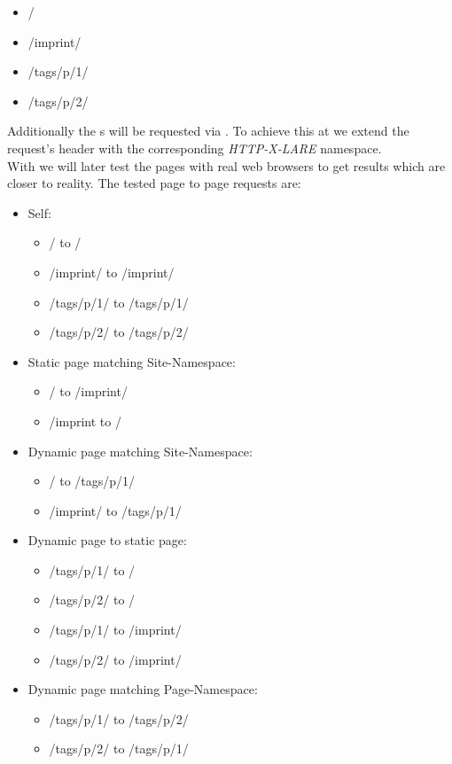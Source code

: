 \begin{itemize}
\item /
\item /imprint/
\item /tags/p/1/
\item /tags/p/2/
\end{itemize}

\noindent{}Additionally the \webPage{}s will be requested via \lare{}.
To achieve this at \curl{} we extend the request's header with the corresponding \emph{HTTP-X-LARE} namespace.
\\
With \selenium{} we will later test the pages with real web browsers to get results which are closer to reality.
The tested page to page requests are:

\begin{itemize}
  \item Self:
    \begin{itemize}
      \item / to /
      \item /imprint/ to /imprint/
      \item /tags/p/1/ to /tags/p/1/
      \item /tags/p/2/ to /tags/p/2/
    \end{itemize}
  \item Static page matching Site-Namespace:
    \begin{itemize}
      \item / to /imprint/
      \item /imprint to /
    \end{itemize}
  \item Dynamic page matching Site-Namespace:
    \begin{itemize}
      \item / to /tags/p/1/
      \item /imprint/ to /tags/p/1/
    \end{itemize}
  \item Dynamic page to static page:
    \begin{itemize}
      \item /tags/p/1/ to /
      \item /tags/p/2/ to /
      \item /tags/p/1/ to /imprint/
      \item /tags/p/2/ to /imprint/
    \end{itemize}
  \item Dynamic page matching Page-Namespace:
    \begin{itemize}
      \item /tags/p/1/ to /tags/p/2/
      \item /tags/p/2/ to /tags/p/1/
    \end{itemize}
\end{itemize}

